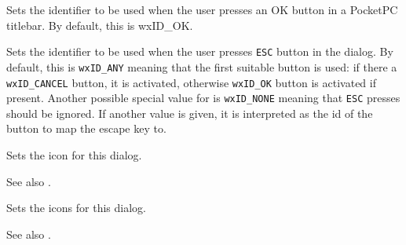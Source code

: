 


\label{wxdialogsetaffirmativeid}


Sets the identifier to be used when the user presses an OK button in a PocketPC titlebar.
By default, this is wxID\_OK.




\label{wxdialogsetescapeid}


Sets the identifier to be used when the user presses \texttt{\textsc{ESC}}
button in the dialog. By default, this is \texttt{wxID\_ANY} meaning that
the first suitable button is used: if there a \texttt{wxID\_CANCEL} button, it
is activated, otherwise \texttt{wxID\_OK} button is activated if present.
Another possible special value for  is \texttt{wxID\_NONE} meaning that
\texttt{\textsc{ESC}} presses should be ignored. If another value is given, it
is interpreted as the id of the button to map the escape key to.


\label{wxdialogseticon}


Sets the icon for this dialog.



See also .


\label{wxdialogseticons}


Sets the icons for this dialog.



See also .


\label{wxdialogsetmodal}


